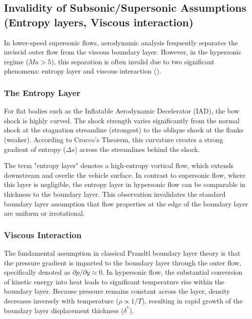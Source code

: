 \subsection{Invalidity of Subsonic/Supersonic Assumptions (Entropy layers, Viscous interaction)}

In lower-speed supersonic flows, aerodynamic analysis frequently separates the inviscid outer flow from the viscous boundary layer. However, in the hypersonic regime ($Ma > 5$), this separation is often invalid due to two significant phenomena: entropy layer and viscous interaction (\cite{AndersonHypersonic}).

\subsubsection*{The Entropy Layer}
For flat bodies such as the Inflatable Aerodynamic Decelerator (IAD), the bow shock is highly curved. The shock strength varies significantly from the normal shock at the stagnation streamline (strongest) to the oblique shock at the flanks (weaker). According to Crocco's Theorem, this curvature creates a strong gradient of entropy ($\Delta s$) across the streamlines behind the shock.
\par
The term "entropy layer" denotes a high-entropy vortical flow, which extends downstream and overlie the vehicle surface. In contrast to supersonic flow, where this layer is negligible, the entropy layer in hypersonic flow can be comparable in thickness to the boundary layer. This observation invalidates the standard boundary layer assumption that flow properties at the edge of the boundary layer are uniform or irrotational.
\par

\subsubsection*{Viscous Interaction}
The fundamental assumption in classical Prandtl boundary layer theory is that the pressure gradient is imparted to the boundary layer through the outer flow, specifically denoted as $\partial p / \partial y \approx 0$. In hypersonic flow, the substantial conversion of kinetic energy into heat leads to significant temperature rise within the boundary layer. Because pressure remains constant across the layer, density decreases inversely with temperature ($\rho \propto 1/T$), resulting in rapid growth of the boundary layer displacement thickness ($\delta^*$).

